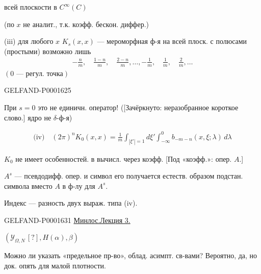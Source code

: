 всей плоскости в $C^\infty(C)$

(по $x$ не аналит., т.к. коэфф. бескон. диффер.)


(iii) для любого $x$ $K_s(x,x)$ — мероморфная ф-я на всей плоск. с полюсами (простыми) возможно лишь
\begin{gather*}
-\frac{n}{m},\quad\frac{1-n}{m},\quad\frac{2-n}{m},\ldots,
-\frac{1}{m},\quad\frac{1}{m},\quad\frac{2}{m},\ldots
\end{gather*}
$(0\text{ — регул. точка})$

\begin{GelfandAdjacentEvidence}{GELFAND-P000162}{5}

При $s=0$ это не единичн. оператор! ([Зачёркнуто: неразобранное короткое слово.] ядро не $\delta$-ф-я)
\end{GelfandAdjacentEvidence}


\begin{gather*}
\text{(iv)}\quad (2\pi)^nK_0(x,x)=\frac{1}{m}
\int_{|\xi'|=1}d\xi'\int_{-\infty}^{0}b_{-m-n}(x,\xi;\lambda)\,d\lambda
\end{gather*}


$K_0$ не имеет особенностей. в вычисл. через коэфф. [Под «коэфф.»: опер. $A$.]


$A^s$ — псевдодифф. опер. и символ его получается естеств. образом подстан. символа вместо $A$ в ф-лу для $A^s$.

Индекс — разность двух выраж. типа (iv).



\begin{GelfandAdjacentEvidence}{GELFAND-P000163}{1}
\underline{Минлос.}\qquad \underline{Лекция 3.}


$(\mathcal{Y}_{\Omega,N}\, [?],H(\alpha),\beta)$

\end{GelfandAdjacentEvidence}


Можно ли указать «предельное пр-во», облад. асимпт. св-вами?
Вероятно, да, но док. опять для малой плотности.


